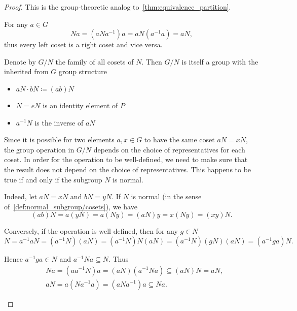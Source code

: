 \begin{proof}
  This is the group-theoretic analog to~\cref{thm:equivalence_partition}.

  \begin{description}
     For any \( a \in G \)
    \begin{equation*}
      Na = (aNa^{-1})a = aN(a^{-1}a) = aN,
    \end{equation*}
    thus every left coset is a right coset and vice versa.

     Denote by \( G / N \) the family of all cosets of \( N \). Then \( G / N \) is itself a group with the inherited from \( G \) group structure
    \begin{itemize}
      \item \( aN \cdot bN \coloneqq (ab)N \)
      \item \( N = eN \) is an identity element of \( P \)
      \item \( a^{-1} N \) is the inverse of \( aN \)
    \end{itemize}

    Since it is possible for two elements \( a, x \in G \) to have the same coset \( aN = xN \), the group operation in \( G / N \) depends on the choice of representatives for each coset. In order for the operation to be well-defined, we need to make sure that the result does not depend on the choice of representatives. This happens to be true if and only if the subgroup \( N \) is normal.

    Indeed, let \( aN = xN \) and \( bN = yN \). If \( N \) is normal (in the sense of~\ref{def:normal_subgroup/cosets}), we have
    \begin{equation*}
      (ab)N = a(yN) = a(Ny) = (aN)y = x(Ny) = (xy)N.
    \end{equation*}

    Conversely, if the operation is well defined, then for any \( g \in N \)
    \begin{equation*}
      N = a^{-1} a N = (a^{-1} N) (a N) = (a^{-1} N) N (a N) = (a^{-1} N) (g N) (a N) = (a^{-1} g a) N.
    \end{equation*}

    Hence \( a^{-1} g a \in N \) and \( a^{-1} N a \subseteq N \). Thus
    \begin{align*}
      &Na = (a a^{-1} N)a = (aN) (a^{-1} N a) \subseteq (aN) N = aN,
      \\
      &aN = a(N a^{-1} a) = (a N a^{-1}) a \subseteq Na.
    \end{align*}


\end{description}
\end{proof}
